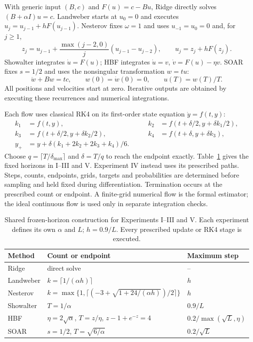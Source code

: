 \documentclass[11pt,a4paper,leqno]{article}
\numberwithin{equation}{section}
\numberwithin{figure}{section}
\numberwithin{table}{section}
\theoremstyle{plain}
\theoremstyle{definition}
\theoremstyle{remark}
\begin{document}
With generic input $(B,c)$ and $F(u)=c-Bu$, Ridge directly solves
$(B+\alpha I)u=c$. Landweber starts at $u_0=0$ and executes
$u_j=u_{j-1}+hF(u_{j-1})$. Nesterov fixes $\omega=1$ and uses
$u_{-1}=u_0=0$ and, for $j\geq1$,
\[
 z_j=u_{j-1}+\frac{\max(j-2,0)}j(u_{j-1}-u_{j-2}),\qquad
 u_j=z_j+hF(z_j).
\]
Showalter integrates $\dot u=F(u)$; HBF integrates
$\dot u=v$, $\dot v=F(u)-\eta v$. SOAR fixes $s=1/2$ and uses the
nonsingular transformation $w=tu$:
\[
 \ddot w+Bw=tc,\qquad w(0)=\dot w(0)=0,\qquad u(T)=w(T)/T.
\]
All positions and velocities start at zero. Iterative outputs are obtained
by executing these recurrences and numerical integrations.

Each flow uses classical RK4 on its first-order state equation $\dot y=f(t,y)$:
\[
\begin{alignedat}{2}
 k_1&=f(t,y),&\qquad k_2&=f(t+\delta/2,y+\delta k_1/2),\\
 k_3&=f(t+\delta/2,y+\delta k_2/2),&\qquad k_4&=f(t+\delta,y+\delta k_3),\\
 y_+&=y+\delta(k_1+2k_2+2k_3+k_4)/6.
\end{alignedat}
\]
Choose $q=\lceil T/\delta_{\max}\rceil$ and $\delta=T/q$ to reach the
endpoint exactly. Table~\ref{tab:native_shared_defaults} gives the fixed
horizons in I--III and V. Experiment IV instead uses its prescribed paths.
Steps, counts, endpoints, grids, targets and probabilities are determined
before sampling and held fixed during differentiation. Termination occurs
at the prescribed count or endpoint. A finite-grid numerical flow is the formal estimator;
the ideal continuous flow is used only in separate integration checks.

\begin{table}[!htbp]\centering\small
\caption{Shared frozen-horizon construction for Experiments I--III and V. Each experiment defines its own $\alpha$ and $L$; $h=0.9/L$. Every prescribed update or RK4 stage is executed.}
\label{tab:native_shared_defaults}
\begin{tabular}{lll}\toprule
Method & Count or endpoint & Maximum step \\\midrule
Ridge & direct solve & -- \\
Landweber & $k=\lceil1/(\alpha h)\rceil$ & $h$ \\
Nesterov & $k=\max\{1,\lceil(-3+\sqrt{1+24/(\alpha h)})/2\rceil\}$ & $h$ \\
Showalter & $T=1/\alpha$ & $0.9/L$ \\
HBF & $\eta=2\sqrt\alpha$, $T=z/\eta$, $z-1+e^{-z}=4$ & $0.2/\max(\sqrt L,\eta)$ \\
SOAR & $s=1/2$, $T=\sqrt{6/\alpha}$ & $0.2/\sqrt L$ \\
\bottomrule\end{tabular}
\end{table}
\end{document}
